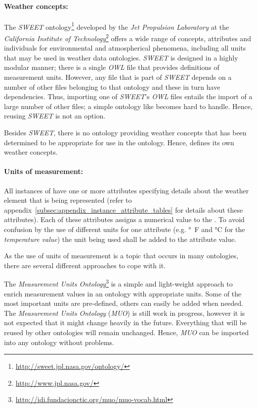 \paragraph{Weather concepts:}

The \emph{SWEET} ontology\cite{SWEET}\footnote{\href{http://sweet.jpl.nasa.gov/ontology/}{http://sweet.jpl.nasa.gov/ontology/}} developed by the \emph{Jet Propulsion Laboratory} at the \emph{California Institute of Technology}\footnote{\href{http://www.jpl.nasa.gov/}{http://www.jpl.nasa.gov/}} offers a wide range of concepts, attributes and individuals for environmental and atmospherical phenomena, including all units that may be used in weather data ontologies. \emph{SWEET} is designed in a highly modular manner; there is a single \emph{OWL} file that provides definitions of measurement units. However, any file that is part of \emph{SWEET} depends on a number of other files belonging to that ontology and these in turn have dependencies. Thus, importing one of \emph{SWEET}'s \emph{OWL} files entails the import of a large number of other files; a simple ontology like \thinkhomeweather becomes hard to handle. Hence, reusing \emph{SWEET} is not an option.

Besides \emph{SWEET}, there is no ontology providing weather concepts that has been determined to be appropriate for use in the \thinkhomeweather ontology. Hence, \thinkhomeweather defines its own weather concepts.

\paragraph{Units of measurement:}

\newcommand{\muo}{\emph{MUO}\xspace}

All instances of  have one or more attributes specifying details about the weather element that is being represented (refer to appendix~\ref{subsec:appendix_instance_attribute_tables} for details about these attributes). Each of these attributes assigns a numerical value to the . To avoid confusion by the use of different units for one attribute (e.g. \si{\degree F} and \si{\celsius} for the \emph{temperature value}) the unit being used shall be added to the attribute value.

As the use of units of measurement is a topic that occurs in many ontologies, there are several different approaches to cope with it.

The \emph{Measurement Units Ontology}\footnote{\href{http://idi.fundacionctic.org/muo/muo-vocab.html}{http://idi.fundacionctic.org/muo/muo-vocab.html}}\cite{MUO} is a simple and light-weight approach to enrich measurement values in an ontology with appropriate units. Some of the most important units are pre-defined, others can easily be added when needed. The \emph{Measurement Units Ontology} (\muo) is still work in progress, however it is not expected that it might change heavily in the future. Everything that will be reused by other ontologies will remain unchanged. Hence, \muo can be imported into any ontology without problems.

